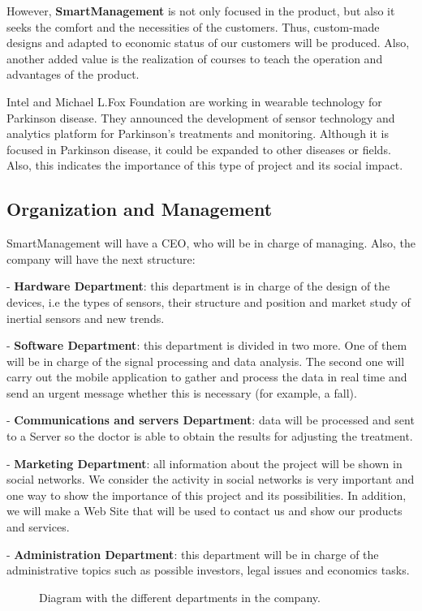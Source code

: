  However, \textbf{SmartManagement} is not only focused in the product, but also it seeks the comfort and the necessities of the customers. Thus, custom-made designs and adapted to economic status of our customers will be produced. Also, another added value is the realization of courses to teach the operation and advantages of the product.
 
 Intel and Michael L.Fox Foundation are working in wearable technology for Parkinson disease. They announced the development of sensor technology and analytics platform for Parkinson's treatments and monitoring\cite{IntelAndMjf}. Although it is focused in Parkinson disease, it could be expanded to other diseases or fields. Also, this indicates the importance of this type of project and its social impact.

\vfill
\subsection{Organization and Management}
SmartManagement will have a CEO, who will be  in charge of managing. Also, the company will have the next structure:

-	\textbf{Hardware Department}: this department is in charge of the design of the devices, i.e the types of sensors, their structure and position and market study of inertial sensors and new trends.

-	\textbf{Software Department}: this department is divided in two more. One of them will be in charge of the signal processing and data analysis. The second one will carry out the mobile application to gather and process the data in real time and send an urgent message whether this is necessary (for example, a fall).

-	\textbf{Communications and servers Department}: data will be processed and sent to a Server so the doctor is able to obtain the results for adjusting the treatment.

-	\textbf{Marketing Department}: all information about the project will be shown in  social networks. We consider the activity in social networks is very important and one way to show the importance of this project and its possibilities.
In addition, we will make a Web Site that will be used to contact us and show our products and services.

-	\textbf{Administration Department}: this department will be in charge of the administrative topics such as possible investors, legal issues and economics tasks.

\begin{figure}[H]
	\centering
	\caption{Diagram with the different departments in the company.}
	\label{fig:Deparments}
\end{figure}

